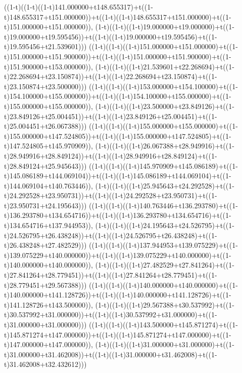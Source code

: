 ((1-t)((1-t)((1-t)141.000000+t148.655317)+t((1-t)148.655317+t151.000000))+t((1-t)((1-t)148.655317+t151.000000)+t((1-t)151.000000+t151.000000)),                                     (1-t)((1-t)((1-t)19.000000+t19.000000)+t((1-t)19.000000+t19.595456))+t((1-t)((1-t)19.000000+t19.595456)+t((1-t)19.595456+t21.539601)))
((1-t)((1-t)((1-t)151.000000+t151.000000)+t((1-t)151.000000+t151.900000))+t((1-t)((1-t)151.000000+t151.900000)+t((1-t)151.900000+t153.000000)),                                     (1-t)((1-t)((1-t)21.539601+t22.268694)+t((1-t)22.268694+t23.150874))+t((1-t)((1-t)22.268694+t23.150874)+t((1-t)23.150874+t23.500000)))
((1-t)((1-t)((1-t)153.000000+t154.100000)+t((1-t)154.100000+t155.000000))+t((1-t)((1-t)154.100000+t155.000000)+t((1-t)155.000000+t155.000000)),                                     (1-t)((1-t)((1-t)23.500000+t23.849126)+t((1-t)23.849126+t25.004451))+t((1-t)((1-t)23.849126+t25.004451)+t((1-t)25.004451+t26.067388)))
((1-t)((1-t)((1-t)155.000000+t155.000000)+t((1-t)155.000000+t147.524805))+t((1-t)((1-t)155.000000+t147.524805)+t((1-t)147.524805+t145.970909)),                                     (1-t)((1-t)((1-t)26.067388+t28.949916)+t((1-t)28.949916+t28.849124))+t((1-t)((1-t)28.949916+t28.849124)+t((1-t)28.849124+t25.945643)))
((1-t)((1-t)((1-t)145.970909+t145.086189)+t((1-t)145.086189+t144.069104))+t((1-t)((1-t)145.086189+t144.069104)+t((1-t)144.069104+t140.763446)),                                     (1-t)((1-t)((1-t)25.945643+t24.292528)+t((1-t)24.292528+t23.950731))+t((1-t)((1-t)24.292528+t23.950731)+t((1-t)23.950731+t24.195643)))
((1-t)((1-t)((1-t)140.763446+t136.293780)+t((1-t)136.293780+t134.654716))+t((1-t)((1-t)136.293780+t134.654716)+t((1-t)134.654716+t137.944953)),                                     (1-t)((1-t)((1-t)24.195643+t24.526795)+t((1-t)24.526795+t26.438248))+t((1-t)((1-t)24.526795+t26.438248)+t((1-t)26.438248+t27.482529)))
((1-t)((1-t)((1-t)137.944953+t139.075229)+t((1-t)139.075229+t140.000000))+t((1-t)((1-t)139.075229+t140.000000)+t((1-t)140.000000+t140.000000)),                                     (1-t)((1-t)((1-t)27.482529+t27.841264)+t((1-t)27.841264+t28.779451))+t((1-t)((1-t)27.841264+t28.779451)+t((1-t)28.779451+t29.567388)))
((1-t)((1-t)((1-t)140.000000+t140.000000)+t((1-t)140.000000+t141.128726))+t((1-t)((1-t)140.000000+t141.128726)+t((1-t)141.128726+t143.500000)),                                     (1-t)((1-t)((1-t)29.567388+t30.537992)+t((1-t)30.537992+t31.000000))+t((1-t)((1-t)30.537992+t31.000000)+t((1-t)31.000000+t31.000000)))
((1-t)((1-t)((1-t)143.500000+t145.871274)+t((1-t)145.871274+t147.000000))+t((1-t)((1-t)145.871274+t147.000000)+t((1-t)147.000000+t147.000000)),                                     (1-t)((1-t)((1-t)31.000000+t31.000000)+t((1-t)31.000000+t31.462008))+t((1-t)((1-t)31.000000+t31.462008)+t((1-t)31.462008+t32.432612)))
